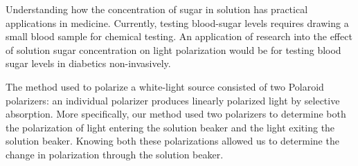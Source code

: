 
Understanding how the concentration of sugar in solution has practical applications in medicine. Currently, testing blood-sugar levels requires drawing a small blood sample for chemical testing. An application of research into the effect of solution sugar concentration on light polarization would be for testing blood sugar levels in diabetics non-invasively.


The method used to polarize a white-light source consisted of two Polaroid polarizers: an individual polarizer produces linearly polarized light by selective absorption. More specifically, our method used two polarizers to determine both the polarization of light entering the solution beaker and the light exiting the solution beaker. Knowing both these polarizations allowed us to determine the change in polarization through the solution beaker.